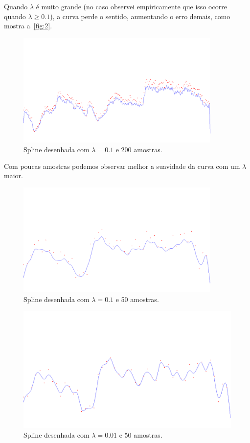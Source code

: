 \documentclass[12pt]{article}
\theoremstyle{plain}
\numberwithin{equation}{section}
\begin{document}
Quando $\lambda$ é muito grande (no caso observei empíricamente que isso ocorre quando
$\lambda\geq0.1$), a curva perde o sentido, aumentando o erro demais, como mostra
a~\autoref{fig:2}.
\vspace{-1cm}
\begin{figure}[h]
  \centering\includegraphics[width=0.9\textwidth]{imgs/200_0-1.png}
  \caption{Spline desenhada com $\lambda=0.1$ e 200 amostras.\label{fig:3}}
\end{figure}

Com poucas amostras podemos observar melhor a suavidade da curva com um $\lambda$ maior.
\vspace{-1cm}
\begin{figure}[H]
  \centering\includegraphics[width=0.9\textwidth]{imgs/50_0-1.png}
  \caption{Spline desenhada com $\lambda=0.1$ e 50 amostras.\label{fig:5}}
\end{figure}

\begin{figure}[h]
  \centering\includegraphics[width=1.0\textwidth]{imgs/50_0-01.png}
  \caption{Spline desenhada com $\lambda=0.01$ e 50 amostras.\label{fig:4}}
\end{figure}
\end{document}
